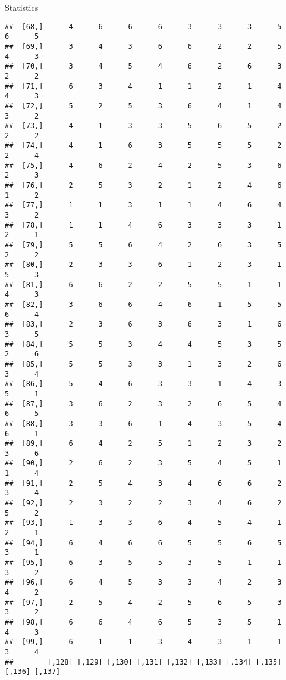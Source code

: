 \documentclass[
  ignorenonframetext,
]{beamer}
\begin{document}
\begin{frame}[fragile]{Statistics}
\begin{verbatim}
##  [68,]      4      6      6      6      3      3      3      5      6      5
##  [69,]      3      4      3      6      6      2      2      5      4      3
##  [70,]      3      4      5      4      6      2      6      3      2      2
##  [71,]      6      3      4      1      1      2      1      4      4      3
##  [72,]      5      2      5      3      6      4      1      4      3      2
##  [73,]      4      1      3      3      5      6      5      2      2      2
##  [74,]      4      1      6      3      5      5      5      2      2      4
##  [75,]      4      6      2      4      2      5      3      6      2      3
##  [76,]      2      5      3      2      1      2      4      6      1      2
##  [77,]      1      1      3      1      1      4      6      4      3      2
##  [78,]      1      1      4      6      3      3      3      1      2      1
##  [79,]      5      5      6      4      2      6      3      5      2      2
##  [80,]      2      3      3      6      1      2      3      1      5      3
##  [81,]      6      6      2      2      5      5      1      1      4      3
##  [82,]      3      6      6      4      6      1      5      5      6      4
##  [83,]      2      3      6      3      6      3      1      6      3      5
##  [84,]      5      5      3      4      4      5      3      5      2      6
##  [85,]      5      5      3      3      1      3      2      6      3      4
##  [86,]      5      4      6      3      3      1      4      3      5      1
##  [87,]      3      6      2      3      2      6      5      4      6      5
##  [88,]      3      3      6      1      4      3      5      4      6      1
##  [89,]      6      4      2      5      1      2      3      2      3      6
##  [90,]      2      6      2      3      5      4      5      1      1      4
##  [91,]      2      5      4      3      4      6      6      2      3      4
##  [92,]      2      3      2      2      3      4      6      2      5      2
##  [93,]      1      3      3      6      4      5      4      1      2      1
##  [94,]      6      4      6      6      5      5      6      5      3      1
##  [95,]      6      3      5      5      3      5      1      1      3      2
##  [96,]      6      4      5      3      3      4      2      3      4      2
##  [97,]      2      5      4      2      5      6      5      3      3      2
##  [98,]      6      6      4      6      5      3      5      1      4      3
##  [99,]      6      1      1      3      4      3      1      1      3      4
##        [,128] [,129] [,130] [,131] [,132] [,133] [,134] [,135] [,136] [,137]

\end{verbatim}
\end{frame}
\end{document}
